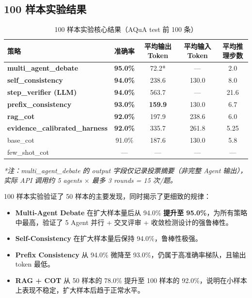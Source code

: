 \documentclass[lang=cn,a4paper,newtx]{elegantpaper}
\begin{document}
\subsection{100 样本实验结果}

\begin{table}[htbp]
\centering
\caption{100 样本实验核心结果（AQuA test 前 100 条）}
\begin{tabular}{lcccc}
\toprule
策略 & 准确率 & 平均输出 Token & 平均输入 Token & 平均推理步数 \\
\midrule
\textbf{multi\_agent\_debate} & \textbf{95.0\%} & 72.2* & --- & 2.0 \\
\textbf{self\_consistency} & \textbf{94.0\%} & 238.6 & 130.0 & 8.0 \\
\textbf{step\_verifier (LLM)} & \textbf{94.0\%} & 563.7 & --- & 21.6 \\
\textbf{prefix\_consistency} & \textbf{93.0\%} & \textbf{159.9} & 130.0 & 6.7 \\
\textbf{rag\_cot} & \textbf{92.0\%} & 197.9 & 238.6 & 6.0 \\
\textbf{evidence\_calibrated\_harness} & \textbf{92.0\%} & 335.7 & 261.8 & 5.25 \\
base\_cot & 91.0\% & 187.6 & 130.0 & 5.8 \\
few\_shot\_cot & --- & --- & --- & --- \\
\bottomrule
\end{tabular}
\end{table}

\textit{*注：multi\_agent\_debate 的 output 字段仅记录投票摘要（非完整 Agent 输出），实际 API 调用约 5 agents $\times$ 最多 3 rounds = 15 次/题。}

100 样本实验验证了 50 样本的主要发现，同时揭示了更细致的规律：

\begin{itemize}
  \item \textbf{Multi-Agent Debate} 在扩大样本量后从 94.0\% \textbf{提升至 95.0\%}，为所有策略中最高，验证了 5 Agent 并行 + 交叉评审 + 收敛检测设计的强鲁棒性。
  \item \textbf{Self-Consistency} 在扩大样本量后保持 94.0\%，鲁棒性极强。
  \item \textbf{Prefix Consistency} 从 94.0\% 微降至 93.0\%，仍属于高准确率梯队，且输出 token 最低。
  \item \textbf{RAG + COT} 从 50 样本的 78.0\% 提升至 100 样本的 92.0\%，说明在小样本上表现不稳定，扩大样本后趋于正常水平。
\end{itemize}
\end{document}
